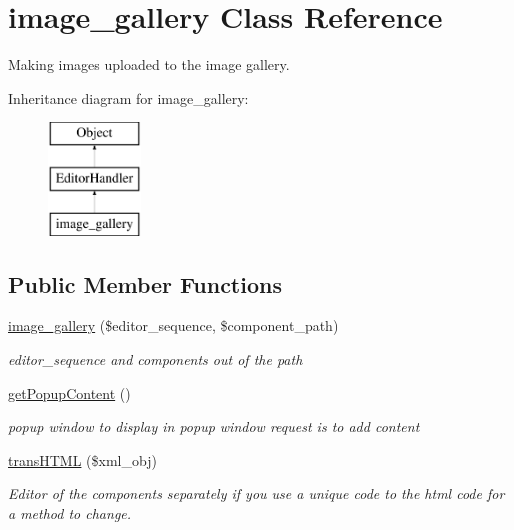 \hypertarget{classimage__gallery}{\section{image\-\_\-gallery Class Reference}
\label{classimage__gallery}
}


Making images uploaded to the image gallery.  


Inheritance diagram for image\-\_\-gallery\-:\begin{figure}[H]
\begin{center}
\leavevmode
\includegraphics[height=3.000000cm]{classimage__gallery}
\end{center}
\end{figure}
\subsection*{Public Member Functions}
\begin{DoxyCompactItemize}
\item 
\hyperlink{classimage__gallery_a61f93b0e279db69d5476ed16ec428200}{image\-\_\-gallery} (\$editor\-\_\-sequence, \$component\-\_\-path)
\begin{DoxyCompactList}\small\item\em editor\-\_\-sequence and components out of the path \end{DoxyCompactList}\item 
\hyperlink{classimage__gallery_a71ee76734048f188f3ec9caf692609b0}{get\-Popup\-Content} ()
\begin{DoxyCompactList}\small\item\em popup window to display in popup window request is to add content \end{DoxyCompactList}\item 
\hyperlink{classimage__gallery_a7e147e64f848be078e9171b061dd70ad}{trans\-H\-T\-M\-L} (\$xml\-\_\-obj)
\begin{DoxyCompactList}\small\item\em Editor of the components separately if you use a unique code to the html code for a method to change. \end{DoxyCompactList}\end{DoxyCompactItemize}

